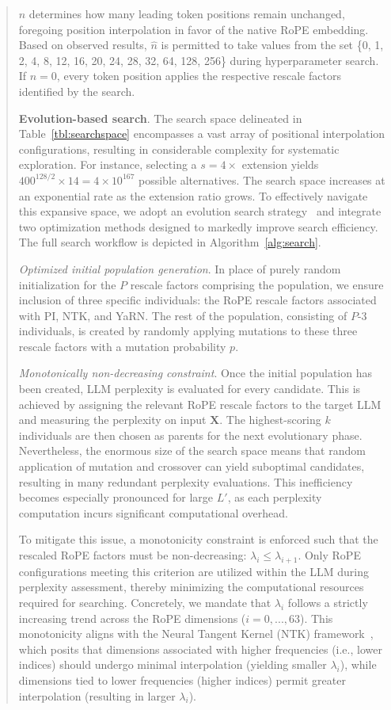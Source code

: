 \begin{abstract}
$\hat{n}$ determines how many leading token positions remain unchanged, foregoing position interpolation in favor of the native RoPE embedding. Based on observed results, $\hat{n}$ is permitted to take values from the set \{0, 1, 2, 4, 8, 12, 16, 20, 24, 28, 32, 64, 128, 256\} during hyperparameter search. If $\hat{n}=0$, every token position applies the respective rescale factors identified by the search.

\textbf{Evolution-based search}. The search space delineated in Table~\ref{tbl:searchspace} encompasses a vast array of positional interpolation configurations, resulting in considerable complexity for systematic exploration. For instance, selecting a $s=4\times$ extension yields $400^{128/2}\times14 = 4\times10^{167}$ possible alternatives. The search space increases at an exponential rate as the extension ratio grows. To effectively navigate this expansive space, we adopt an evolution search strategy~\cite{guo2020single} and integrate two optimization methods designed to markedly improve search efficiency. The full search workflow is depicted in Algorithm~\ref{alg:search}.

\textit{Optimized initial population generation}. In place of purely random initialization for the $P$ rescale factors comprising the population, we ensure inclusion of three specific individuals: the RoPE rescale factors associated with PI, NTK, and YaRN. The rest of the population, consisting of $P$-3 individuals, is created by randomly applying mutations to these three rescale factors with a mutation probability $p$.

\textit{Monotonically non-decreasing constraint}. Once the initial population has been created, LLM perplexity is evaluated for every candidate. This is achieved by assigning the relevant RoPE rescale factors to the target LLM and measuring the perplexity on input $\mathbf{X}$. The highest-scoring $k$ individuals are then chosen as parents for the next evolutionary phase. Nevertheless, the enormous size of the search space means that random application of mutation and crossover can yield suboptimal candidates, resulting in many redundant perplexity evaluations. This inefficiency becomes especially pronounced for large $L'$, as each perplexity computation incurs significant computational overhead.

To mitigate this issue, a monotonicity constraint is enforced such that the rescaled RoPE factors must be non-decreasing: $\lambda_i \leq \lambda_{i+1}$. Only RoPE configurations meeting this criterion are utilized within the LLM during perplexity assessment, thereby minimizing the computational resources required for searching. Concretely, we mandate that $\lambda_i$ follows a strictly increasing trend across the RoPE dimensions ($i=0,...,63$). This monotonicity aligns with the Neural Tangent Kernel (NTK) framework~\cite{jacot2018neural,tancik2020fourier,ntk}, which posits that dimensions associated with higher frequencies (i.e., lower indices) should undergo minimal interpolation (yielding smaller $\lambda_i$), while dimensions tied to lower frequencies (higher indices) permit greater interpolation (resulting in larger $\lambda_i$).


\end{abstract}
